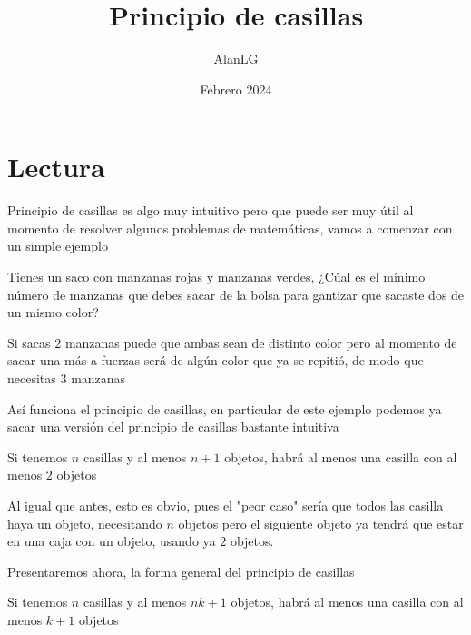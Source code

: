 \documentclass[11pt]{scrartcl}
\title{Principio de casillas}
\author{AlanLG}
\date{Febrero 2024}
\begin{document}
\maketitle

\section{Lectura}
Principio de casillas es algo muy intuitivo pero que puede ser muy útil al momento de resolver algunos problemas de matemáticas, vamos a comenzar con un simple ejemplo 
\begin{example}
    Tienes un saco con manzanas rojas y manzanas verdes, ¿Cúal es el mínimo número de manzanas que debes sacar de la bolsa para gantizar que sacaste dos de un mismo color?
\end{example}
\begin{flushleft}
    

Si sacas $2$ manzanas puede que ambas sean de distinto color pero al momento de sacar una más a fuerzas será de algún color que ya se repitió, de modo que necesitas $3$ manzanas

Así funciona el principio de casillas, en particular de este ejemplo podemos ya  sacar una versión del principio de casillas bastante intuitiva
\end{flushleft}
\begin{theorem}
    Si tenemos $n$ casillas y al menos $n+1$ objetos, habrá al menos una casilla con al menos $2$ objetos
\end{theorem}
\begin{flushleft}
Al igual que antes, esto es obvio, pues el "peor caso" sería que todos las casilla haya un objeto, necesitando $n$ objetos pero el siguiente objeto ya tendrá que estar en una caja con un objeto, usando ya $2$ objetos.
\end{flushleft}
Presentaremos ahora, la forma general del principio de casillas
\begin{theorem}
    Si tenemos $n$ casillas y al menos $nk+1$ objetos, habrá al menos una casilla con al menos $k+1$ objetos
\end{theorem}
\end{document}
